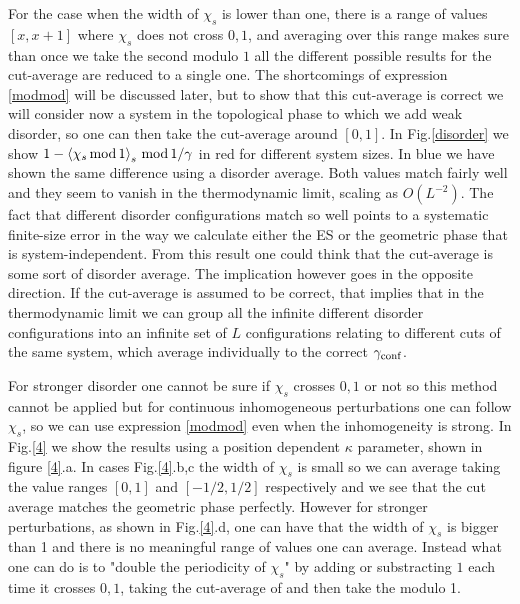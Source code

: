 \documentclass[twocolumn,amsmath,longbibliography,amssymb,superscriptaddress]{revtex4-1}
\begin{document}
For the case when the width of $\chi_s$ is lower than one, there is a range of values $[x,x+1]$ where $\chi_s$ does not cross $0,1$, and averaging over this range makes sure than once we take the second modulo $1$ all the different possible results for the cut-average are reduced to a single one. The shortcomings of expression \ref{modmod} will be discussed later, but to show that this cut-average is correct we will consider now a system in the topological phase to which we add weak disorder, so one can then take the cut-average around $[0,1]$. In Fig.\ref{disorder} we show $1 - \expval{\chi_s \, {\rm mod}\, 1}_s \, {\rm mod}\, 1 /\gamma$ in red for different system sizes. In blue we have shown the same difference using a disorder average. Both values match fairly well and they seem to vanish in the thermodynamic limit, scaling as $O(L^{-2})$. The fact that different disorder configurations match so well points to a systematic finite-size error in the way we calculate either the ES or the geometric phase that is system-independent. From this result one could think that the cut-average is some sort of disorder average. The implication however goes in the opposite direction. If the cut-average is assumed to be correct, that implies that in the thermodynamic limit we can group all the infinite different disorder configurations into an infinite set of $L$ configurations relating to different cuts of the same system, which average individually to the correct $\gamma_{\rm conf}$.

For stronger disorder one cannot be sure if $\chi_s$ crosses $0,1$ or not so this method cannot be applied but for continuous inhomogeneous perturbations one can follow $\chi_s$, so we can use expression \ref{modmod} even when the inhomogeneity is strong. In Fig.\ref{4} we show the results using a position dependent $\kappa$ parameter, shown in figure \ref{4}.a. In cases Fig.\ref{4}.b,c the width of $\chi_s$ is small so we can average taking the value ranges $[0,1]$ and $[-1/2,1/2]$ respectively and we see that the cut average matches the geometric phase perfectly. However for stronger perturbations, as shown in Fig.\ref{4}.d, one can have that the width of $\chi_s$ is bigger than 1 and there is no meaningful range of values one can average. Instead what one can do is to "double the periodicity of $\chi_s$" by adding or substracting $1$ each time it crosses $0,1$, taking the cut-average of and then take the modulo 1. 
\end{document}
